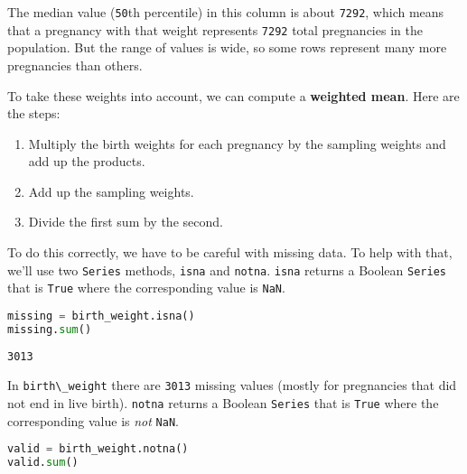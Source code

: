 The median value (\passthrough{\lstinline!50!}th percentile) in this
column is about \passthrough{\lstinline!7292!}, which means that a
pregnancy with that weight represents \passthrough{\lstinline!7292!}
total pregnancies in the population. But the range of values is wide, so
some rows represent many more pregnancies than others.

To take these weights into account, we can compute a \textbf{weighted
mean}. Here are the steps:

\begin{enumerate}
\def\labelenumi{\arabic{enumi}.}
\item
  Multiply the birth weights for each pregnancy by the sampling weights
  and add up the products.
\item
  Add up the sampling weights.
\item
  Divide the first sum by the second.
\end{enumerate}

To do this correctly, we have to be careful with missing data. To help
with that, we'll use two \passthrough{\lstinline!Series!} methods,
\passthrough{\lstinline!isna!} and \passthrough{\lstinline!notna!}.
\passthrough{\lstinline!isna!} returns a Boolean
\passthrough{\lstinline!Series!} that is \passthrough{\lstinline!True!}
where the corresponding value is \passthrough{\lstinline!NaN!}.


\begin{lstlisting}[language=Python,style=source]
missing = birth_weight.isna()
missing.sum()
\end{lstlisting}

\begin{lstlisting}[style=output]
3013
\end{lstlisting}

In \passthrough{\lstinline!birth\_weight!} there are
\passthrough{\lstinline!3013!} missing values (mostly for pregnancies
that did not end in live birth). \passthrough{\lstinline!notna!} returns
a Boolean \passthrough{\lstinline!Series!} that is
\passthrough{\lstinline!True!} where the corresponding value is
\emph{not} \passthrough{\lstinline!NaN!}.

\begin{lstlisting}[language=Python,style=source]
valid = birth_weight.notna()
valid.sum()
\end{lstlisting}

